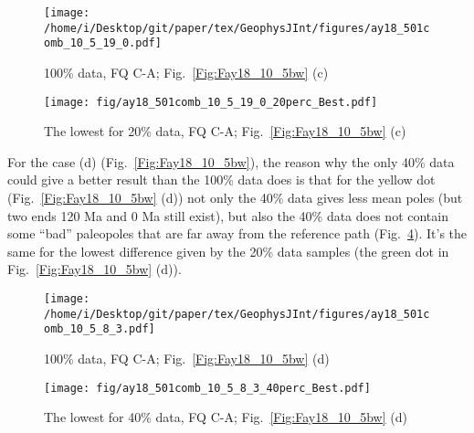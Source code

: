 \begin{figure*}[tbp]
  \captionsetup[subfigure]{labelformat=empty,aboveskip=-6pt,belowskip=-6pt}
  \centering
  \begin{subfigure}[htbp]{.49\textwidth}
    \captionsetup{skip=0pt}
    \centering
    \texttt{[image: /home/i/Desktop/git/paper/tex/GeophysJInt/figures/ay18\_501comb\_10\_5\_19\_0.pdf]}
	\caption{100\% data, FQ C-A; Fig.~\ref{Fig:Fay18_10_5bw}
	(c)}\label{Fig:Fay18_10_5b501_}
  \end{subfigure}
  \begin{subfigure}[htbp]{.49\textwidth}
    \captionsetup{skip=0pt}
    \centering
    \texttt{[image: fig/ay18\_501comb\_10\_5\_19\_0\_20perc\_Best.pdf]}  %
    \caption{The lowest for 20\% data, FQ C-A;
	Fig.~\ref{Fig:Fay18_10_5bw} (c)}\label{Fig:Fay18_10_5b501l20p}
  \end{subfigure}
  \caption[Less data, better similarity?]{Comparing the 100\% Indian
  120 Ma paleomagnetic data derived result with the best of the only
  20\% data (giving even better similarity) derived results (the dark green dot
  in Fig.~\ref{Fig:Fay18_10_5bw}
  (c)).}\label{Fig:Fay18_10_5b501l20p_vs_100p}
\end{figure*}

For the case (d) (Fig.~\ref{Fig:Fay18_10_5bw}), the reason why the only 40\%
data could give a better result than the 100\% data does is that for the yellow
dot (Fig.~\ref{Fig:Fay18_10_5bw} (d)) not only the 40\% data gives less mean
poles (but two ends 120 Ma and 0 Ma still exist), but also the 40\% data does
not contain some ``bad'' paleopoles that are far away from the reference path
(Fig.~\ref{Fig:Fay18_10_5w501l40p}). It's the same for the lowest difference
given by the 20\% data samples (the green dot in Fig.~\ref{Fig:Fay18_10_5bw}
(d)).

\begin{figure*}[tbp]
  \captionsetup[subfigure]{labelformat=empty,aboveskip=-6pt,belowskip=-6pt}
  \centering
  \begin{subfigure}[htbp]{.49\textwidth}
    \captionsetup{skip=0pt}
    \centering
    \texttt{[image: /home/i/Desktop/git/paper/tex/GeophysJInt/figures/ay18\_501comb\_10\_5\_8\_3.pdf]}
	\caption{100\% data, FQ C-A; Fig.~\ref{Fig:Fay18_10_5bw}
	(d)}\label{Fig:Fay18_10_5w501}
  \end{subfigure}
  \begin{subfigure}[htbp]{.49\textwidth}
    \captionsetup{skip=0pt}
    \centering
    \texttt{[image: fig/ay18\_501comb\_10\_5\_8\_3\_40perc\_Best.pdf]}  %
    \caption{The lowest for 40\% data, FQ C-A;
	Fig.~\ref{Fig:Fay18_10_5bw} (d)}\label{Fig:Fay18_10_5w501l40p}
  \end{subfigure}
  \caption[Less data, better similarity?]{Comparing the 100\% Indian
  120 Ma paleomagnetic data derived result with the best of the only
  40\% data (giving even better similarity) derived results (the green dot in
  Fig.~\ref{Fig:Fay18_10_5bw} (d)).}\label{Fig:Fay18_10_5w501l40p_vs_100p}
\end{figure*}

